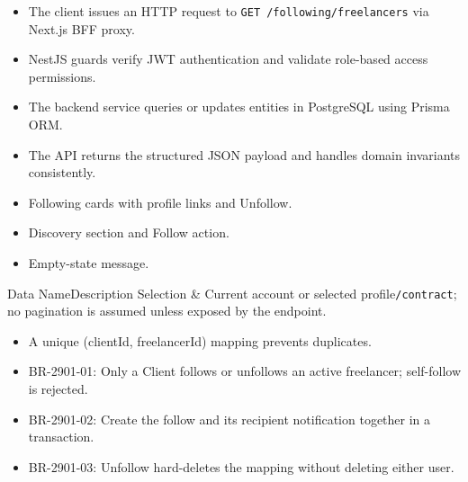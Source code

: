 \begin{itemize}[leftmargin=1.6em,topsep=3pt,itemsep=2pt,parsep=0pt,label=$\bullet$]
    \item The client issues an HTTP request to \texttt{GET /\allowbreak{}following/\allowbreak{}freelancers} via Next.js BFF proxy.
    \item NestJS guards verify JWT authentication and validate role-based access permissions.
    \item The backend service queries or updates entities in PostgreSQL using Prisma ORM.
    \item The API returns the structured JSON payload and handles domain invariants consistently.
\end{itemize}

\begin{itemize}[leftmargin=1.6em,topsep=3pt,itemsep=2pt,parsep=0pt,label=$\bullet$]
    \item Following cards with profile links and Unfollow.
    \item Discovery section and Follow action.
    \item Empty-state message.
\end{itemize}


\begin{specdatatable}{Data Name}{Description}
Selection & Current account or selected profile\texttt{/\allowbreak{}contract}; no pagination is assumed unless exposed by the endpoint.\\ \hline
\end{specdatatable}

\begin{itemize}[leftmargin=1.6em,topsep=3pt,itemsep=2pt,parsep=0pt,label=$\bullet$]
    \item A unique (clientId, freelancerId) mapping prevents duplicates.
\end{itemize}

\begin{itemize}[leftmargin=1.6em,topsep=3pt,itemsep=2pt,parsep=0pt,label=$\bullet$]\brrulelist
    \item BR-2901-01: Only a Client follows or unfollows an active freelancer; self-follow is rejected.
    \item BR-2901-02: Create the follow and its recipient notification together in a transaction.
    \item BR-2901-03: Unfollow hard-deletes the mapping without deleting either user.
\end{itemize}

